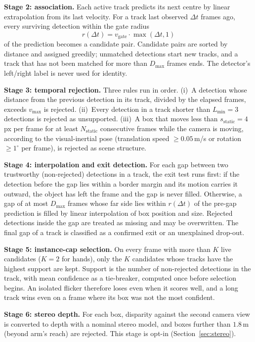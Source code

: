 \documentclass[journal]{IEEEtran}
\begin{document}
\textbf{Stage 2: association.} Each active track predicts its next centre by linear extrapolation from its last velocity. For a track last observed $\Delta t$ frames ago, every surviving detection within the gate radius
\begin{equation}
r(\Delta t)=v_{\mathrm{gate}}\cdot\max(\Delta t,1)
\label{eq:gate}
\end{equation}
of the prediction becomes a candidate pair. Candidate pairs are sorted by distance and assigned greedily; unmatched detections start new tracks, and a track that has not been matched for more than $D_{\max}$ frames ends. The detector's left/right label is never used for identity.

\textbf{Stage 3: temporal rejection.} Three rules run in order. (i)~A detection whose distance from the previous detection in its track, divided by the elapsed frames, exceeds $v_{\max}$ is rejected. (ii)~Every detection in a track shorter than $L_{\min}=3$ detections is rejected as unsupported. (iii)~A box that moves less than $s_{\mathrm{static}}=4$\,px per frame for at least $N_{\mathrm{static}}$ consecutive frames while the camera is moving, according to the visual-inertial pose (translation speed $\ge0.05$\,m/s or rotation $\ge1^\circ$ per frame), is rejected as scene structure.

\textbf{Stage 4: interpolation and exit detection.} For each gap between two trustworthy (non-rejected) detections in a track, the exit test runs first: if the detection before the gap lies within a border margin and its motion carries it outward, the object has left the frame and the gap is never filled. Otherwise, a gap of at most $D_{\max}$ frames whose far side lies within $r(\Delta t)$ of the pre-gap prediction is filled by linear interpolation of box position and size. Rejected detections inside the gap are treated as missing and may be overwritten. The final gap of a track is classified as a confirmed exit or an unexplained drop-out.

\textbf{Stage 5: instance-cap selection.} On every frame with more than $K$ live candidates ($K=2$ for hands), only the $K$ candidates whose tracks have the highest support are kept. Support is the number of non-rejected detections in the track, with mean confidence as a tie-breaker, computed once before selection begins. An isolated flicker therefore loses even when it scores well, and a long track wins even on a frame where its box was not the most confident.

\textbf{Stage 6: stereo depth.} For each box, disparity against the second camera view is converted to depth with a nominal stereo model, and boxes further than $1.8$\,m (beyond arm's reach) are rejected. This stage is opt-in (Section~\ref{sec:stereo}).
\end{document}
